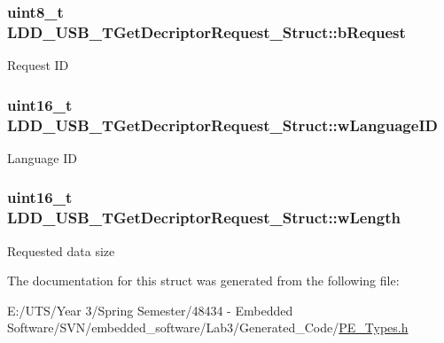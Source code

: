 \subsubsection[{b\+Request}]{\setlength{\rightskip}{0pt plus 5cm}uint8\+\_\+t L\+D\+D\+\_\+\+U\+S\+B\+\_\+\+T\+Get\+Decriptor\+Request\+\_\+\+Struct\+::b\+Request}\label{struct_l_d_d___u_s_b___t_get_decriptor_request___struct_aa7651472aa5110086f335c0b79c0bc5b}
Request I\+D \hypertarget{struct_l_d_d___u_s_b___t_get_decriptor_request___struct_a228c41af26c45c1fa18d964c0702a4b4}{}
\subsubsection[{w\+Language\+I\+D}]{\setlength{\rightskip}{0pt plus 5cm}uint16\+\_\+t L\+D\+D\+\_\+\+U\+S\+B\+\_\+\+T\+Get\+Decriptor\+Request\+\_\+\+Struct\+::w\+Language\+I\+D}\label{struct_l_d_d___u_s_b___t_get_decriptor_request___struct_a228c41af26c45c1fa18d964c0702a4b4}
Language I\+D \hypertarget{struct_l_d_d___u_s_b___t_get_decriptor_request___struct_af9ac7409b4031aa6f3ec5da9d79b06eb}{}
\subsubsection[{w\+Length}]{\setlength{\rightskip}{0pt plus 5cm}uint16\+\_\+t L\+D\+D\+\_\+\+U\+S\+B\+\_\+\+T\+Get\+Decriptor\+Request\+\_\+\+Struct\+::w\+Length}\label{struct_l_d_d___u_s_b___t_get_decriptor_request___struct_af9ac7409b4031aa6f3ec5da9d79b06eb}
Requested data size 

The documentation for this struct was generated from the following file\+:\begin{DoxyCompactItemize}
\item 
E\+:/\+U\+T\+S/\+Year 3/\+Spring Semester/48434 -\/ Embedded Software/\+S\+V\+N/embedded\+\_\+software/\+Lab3/\+Generated\+\_\+\+Code/\hyperlink{_p_e___types_8h}{P\+E\+\_\+\+Types.\+h}\end{DoxyCompactItemize}
